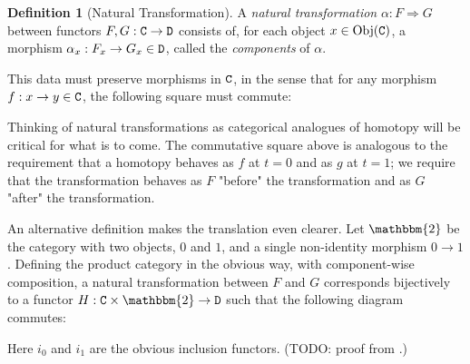 \documentclass[11 pt]{amsart}
\theoremstyle{plain}   %
\theoremstyle{definition}
\newtheorem{defn}{Definition}[section]
\theoremstyle{remark}
\numberwithin{equation}{section}
\def\nat{\Rightarrow}
\newcommand{\cat}[1]{{\normalfont\texttt{#1}}}
\newcommand{\Obj}[1]{\text{Obj}(\cat{#1})}
\begin{document}
\begin{defn}[Natural Transformation]\label{natural transformation}
	A \emph{natural transformation} $\alpha: F\nat G$ between
	functors $F,G:\cat{C}\rightarrow\cat{D}$ consists of, for each
	object $x\in\Obj{C}$, a morphism $\alpha_x: F_x\rightarrow G_x\in \cat{D}$,
	called the \emph{components} of $\alpha$.

	This data must preserve morphisms in $\cat{C}$, in the sense that for any
	morphism $f: x\rightarrow y\in\cat{C}$, the following square must commute:
	\begin{figure}[H]
		\centering
	\end{figure}
\end{defn}

Thinking of natural transformations as categorical analogues of homotopy will be
critical for what is to come. The commutative square above is analogous to the
requirement that a homotopy behaves as $f$ at $t=0$ and as $g$ at $t=1$; we
require that the transformation behaves as $F$ "before" the transformation and
as $G$ "after" the transformation.

An alternative definition makes the translation even clearer. Let $\mathbbm{2}$
be the category with two objects, $0$ and $1$, and a single non-identity
morphism $0\rightarrow 1$. Defining the product category in the obvious way,
with component-wise composition, a natural transformation between $F$ and $G$
corresponds bijectively to a functor $H:
	\cat{C}\times\mathbbm{2}\rightarrow\cat{D}$ such that the following diagram
commutes:

\begin{figure}[H]
	\centering
\end{figure}

Here $i_0$ and $i_1$ are the obvious inclusion functors. (TODO: proof from
\cite[Lemma 1.5.1]{Riehl}.)
\end{document}
